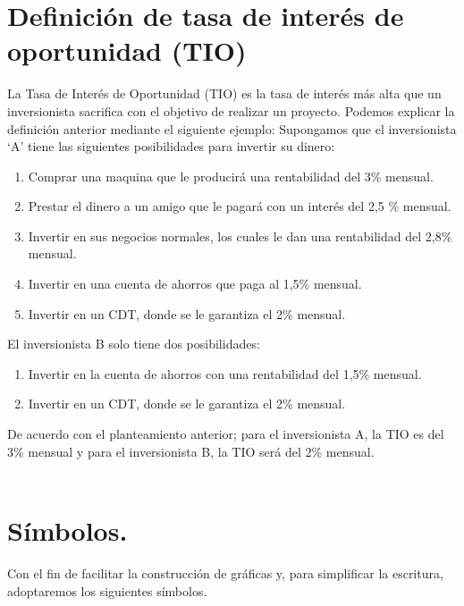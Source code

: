 \section{Definición de tasa de interés de oportunidad (TIO)}
La Tasa de Interés de Oportunidad (TIO) es la tasa de interés más alta que un inversionista sacrifica con el objetivo de realizar un proyecto. Podemos explicar la definición anterior mediante el siguiente ejemplo: Supongamos que el inversionista ‘A’ tiene las siguientes posibilidades para invertir su dinero:
\begin{enumerate}[label=\alph*)]
	\item Comprar una maquina que le producirá una rentabilidad del 3\% mensual.
	\item Prestar el dinero a un amigo que le pagará con un interés del 2,5 \% mensual.
	\item Invertir en sus negocios normales, los cuales le dan una rentabilidad del 2,8\% mensual.
	\item Invertir en una cuenta de ahorros que paga al 1,5\% mensual.
	\item Invertir en un CDT, donde se le garantiza el 2\% mensual.
\end{enumerate}
El inversionista B solo tiene dos posibilidades:
\begin{enumerate}[label=\alph*)]
	\item Invertir en la cuenta de ahorros con una rentabilidad del 1,5\% mensual.
	\item Invertir en un CDT, donde se le garantiza el 2\% mensual.
\end{enumerate}
De acuerdo con el planteamiento anterior; para el inversionista A, la TIO es del 3\% mensual y para el inversionista B, la TIO será del 2\% mensual.
\\
\\


\section{Símbolos.}

Con el fin de facilitar la construcción de gráficas y, para simplificar la escritura, adoptaremos los siguientes símbolos.\\

